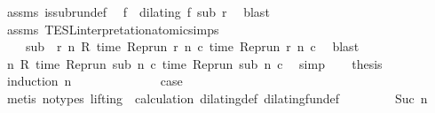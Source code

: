 \begin{isabellebody}
\ assms{\isacharparenleft}{}{\isacharparenright}\ is{\isacharunderscore}subrun{\isacharunderscore}def\ \isamarkupfalse%
\ f\ \ {\isacharasterisk}{\isacharcolon}{\isacartoucheopen}dilating\ f\ sub\ r{\isacartoucheclose}\ \isamarkupfalse%
\ blast\isanewline
\ \ \isamarkupfalse%
\ \isamarkupfalse%
\ assms{\isacharparenleft}{}{\isacharparenright}\ TESL{\isacharunderscore}interpretation{\isacharunderscore}atomic{\isachardot}simps{\isacharparenleft}{}{\isacharparenright}\ \isamarkupfalse%
\isanewline
\ \ \ \ {\isacartoucheopen}sub\ {\isasymin}\ {\isacharbraceleft}r{\isachardot}\ {\isasymforall}n{\isachardot}\ R\ {\isacharparenleft}time\ {\isacharparenleft}{\isacharparenleft}Rep{\isacharunderscore}run\ r{\isacharparenright}\ n\ c\ time\ {\isacharparenleft}{\isacharparenleft}Rep{\isacharunderscore}run\ r{\isacharparenright}\ n\ c\ \isamarkupfalse%
\ blast\isanewline
\ \ \isamarkupfalse%
\ {}{\isacharcolon}{\isacartoucheopen}{\isasymforall}n{\isachardot}\ R\ {\isacharparenleft}time\ {\isacharparenleft}{\isacharparenleft}Rep{\isacharunderscore}run\ sub{\isacharparenright}\ n\ c\ time\ {\isacharparenleft}{\isacharparenleft}Rep{\isacharunderscore}run\ sub{\isacharparenright}\ n\ c\ \isamarkupfalse%
\ simp\isanewline
\ \ \isamarkupfalse%
\ {\isacharquery}thesis\isanewline
\ \ \isamarkupfalse%
\ {\isacharparenleft}induction\ n{\isacharparenright}\isanewline
\ \ \ \ \isamarkupfalse%
\ {}\isanewline
\ \ \ \ \isamarkupfalse%
\ \isamarkupfalse%
\ {\isacharquery}case\isanewline
\ \ \ \ \ \ \isamarkupfalse%
\ {\isacharparenleft}metis\ {\isacharparenleft}no{\isacharunderscore}types{\isacharcomma}\ lifting{\isacharparenright}\ {}\ calculation\ dilating{\isacharunderscore}def\ dilating{\isacharunderscore}fun{\isacharunderscore}def{\isacharparenright}\isanewline
\ \ \isamarkupfalse%
\isanewline
\ \ \ \ \isamarkupfalse%
\ {\isacharparenleft}Suc\ n{\isacharparenright}\isanewline
\ \ \ \ \isamarkupfalse%

\end{isabellebody}
